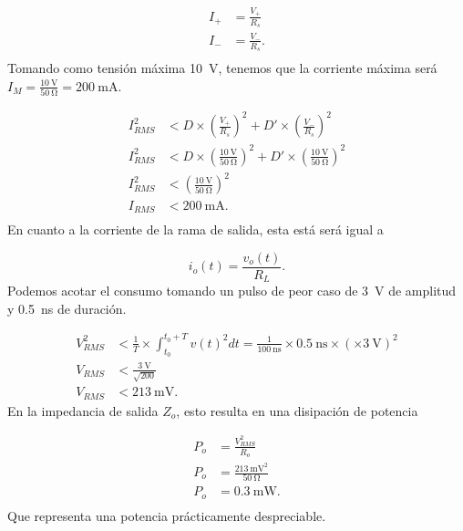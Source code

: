\begin{equation}
    \begin{aligned}
        I_+ &= \frac{V_+}{R_s} \\
        I_- &= \frac{V_-}{R_s}. \\
    \end{aligned}
\end{equation}
Tomando como tensión máxima \qty{10}{\volt}, tenemos que la corriente máxima será
$I_M = \frac{ \qty{10}{\volt}}{ \qty{50}{\ohm}} = \qty{200}{\milli\ampere}$.

\begin{equation}
    \begin{aligned}
        I_{RMS}^2 &< D \times \left( \frac{V_+}{R_s} \right) ^2 + D' \times
        \left( \frac{V_-}{R_s} \right) ^2 \\
        I_{RMS}^2 &< D \times \left( \frac{\qty{10}{\volt}}{\qty{50}{\ohm}}
        \right) ^2 + D' \times
        \left( \frac{\qty{10}{\volt}}{\qty{50}{\ohm}} \right) ^2 \\
        I_{RMS}^2 &< \left( \frac{\qty{10}{\volt}}{\qty{50}{\ohm}} \right) ^2  \\
        I_{RMS} &< \qty{200}{\milli\ampere}. \\
    \end{aligned}
\end{equation}
En cuanto a la corriente de la rama de salida, esta está será igual a

\begin{equation}
    i_o(t) = \frac{v_o(t)}{R_L}.
\end{equation}
Podemos acotar el consumo tomando un pulso de peor caso de \qty{3}{\volt} de
amplitud y \qty{0.5}{\nano\second} de duración.

\begin{equation}
    \begin{aligned}
        V_{RMS}^2 &< \frac{1}{T} \times \int_{t_0}^{t_0+T} v(t)^2dt =
        \frac{1}{\qty{100}{\nano\second}} \times \qty{0.5}{\nano\second} \times
        \left( \times \qty{3}{\volt} \right )^2 \\
        V_{RMS} &< \frac{\qty{3}{\volt}}{\sqrt{200}} \\
        V_{RMS} &< \qty{213}{\milli\volt}.
    \end{aligned}
\end{equation}
En la impedancia de salida $Z_o$, esto resulta en una disipación de potencia

\begin{equation}
    \begin{aligned}
        P_{o} &= \frac{V_{RMS}^2}{R_o} \\
        P_{o} &= \frac{ \qty{213}{\milli\volt}^2}{ \qty{50}{\ohm}} \\
        P_{o} &= \qty{0.3}{\milli\watt}. \\
    \end{aligned}
\end{equation}
Que representa una potencia prácticamente despreciable.

